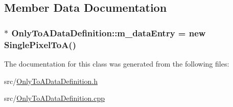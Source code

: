 \subsection{Member Data Documentation}
\hypertarget{classOnlyToADataDefinition_abb0a23c47fcf037c042e8529163a1e31}{
\subsubsection[{m\+\_\+data\+Entry}]{$\ast$ Only\+To\+A\+Data\+Definition\+::m\+\_\+data\+Entry = new {\bf Single\+Pixel\+To\+A}()\hspace{0.3cm}{\ttfamily [protected]}}}\label{classOnlyToADataDefinition_abb0a23c47fcf037c042e8529163a1e31}


The documentation for this class was generated from the following files\+:\begin{DoxyCompactItemize}
\item 
src/\hyperlink{OnlyToADataDefinition_8h}{Only\+To\+A\+Data\+Definition.\+h}\item 
src/\hyperlink{OnlyToADataDefinition_8cpp}{Only\+To\+A\+Data\+Definition.\+cpp}\end{DoxyCompactItemize}
